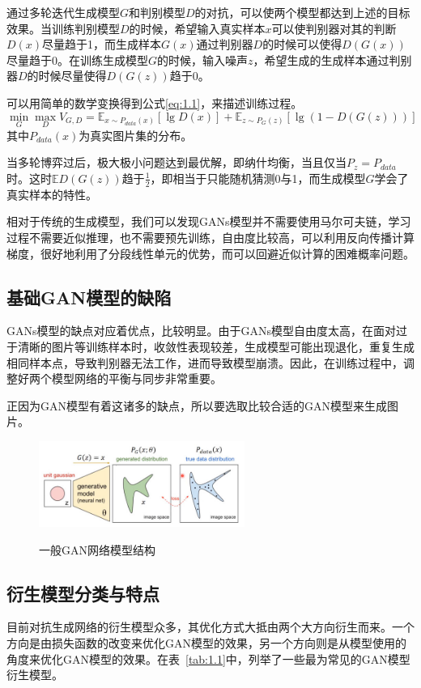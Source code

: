 通过多轮迭代生成模型$G$和判别模型$D$的对抗，可以使两个模型都达到上述的目标效果。当训练判别模型$D$的时候，希望输入真实样本$x$可以使判别器对其的判断$D(x)$尽量趋于1，而生成样本$G(x)$通过判别器$D$的时候可以使得$D(G(x))$尽量趋于0。在训练生成模型$G$的时候，输入噪声$z$，希望生成的生成样本通过判别器$D$的时候尽量使得$D(G(z))$趋于0。

可以用简单的数学变换得到公式\eqref{eq:1.1}，来描述训练过程。
\begin{equation}
    \label{eq:1.1}
    \min_{G}\max_{D} V_{G,D} = \mathbb{E}_{x \sim P_{data}(x)}[\lg D(x)] + \mathbb{E}_{z \sim P_{G}(z)}[\lg (1-D(G(z)))]
\end{equation}
其中$P_{data}(x)$为真实图片集的分布。

当多轮博弈过后，极大极小问题达到最优解，即纳什均衡，当且仅当$P_z = P_{data}$时。这时$\mathbb{E} D(G(z))$趋于$\frac{1}{2}$，即相当于只能随机猜测0与1，而生成模型$G$学会了真实样本的特性。

相对于传统的生成模型，我们可以发现GANs模型并不需要使用马尔可夫链，学习过程不需要近似推理，也不需要预先训练，自由度比较高，可以利用反向传播计算梯度，很好地利用了分段线性单元的优势，而可以回避近似计算的困难概率问题。
\subsection{基础GAN模型的缺陷}
GANs模型的缺点对应着优点，比较明显。由于GANs模型自由度太高，在面对过于清晰的图片等训练样本时，收敛性表现较差，生成模型可能出现退化，重复生成相同样本点，导致判别器无法工作，进而导致模型崩溃。因此，在训练过程中，调整好两个模型网络的平衡与同步非常重要。

正因为GAN模型有着这诸多的缺点，所以要选取比较合适的GAN模型来生成图片。

\begin{figure}[!htbp]
    \centering
    \includegraphics[width=0.6\textwidth]
    {figures/ganprograss.jpeg}\\
    \caption{一般GAN网络模型结构}
    \label{fig:GAN}
  \end{figure}

\subsection{衍生模型分类与特点}
目前对抗生成网络的衍生模型众多，其优化方式大抵由两个大方向衍生而来。一个方向是由损失函数的改变来优化GAN模型的效果，另一个方向则是从模型使用的角度来优化GAN模型的效果。在表~\ref{tab:1.1}中，列举了一些最为常见的GAN模型衍生模型。

